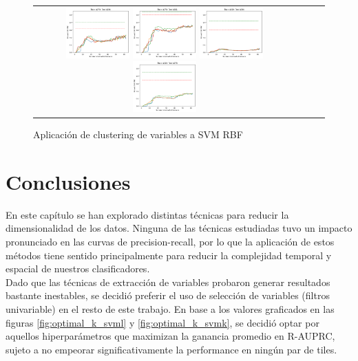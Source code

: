 \begin{figure}[h!]
\begin{tabular}{cccc}
\includegraphics[width=0.25\textwidth]{Kap5/rbf_ALL_LINKAGES_train=b278test=b234.png}  \includegraphics[width=0.25\textwidth]{Kap5/rbf_ALL_LINKAGES_train=b278test=b261.png} 
 \includegraphics[width=0.25\textwidth]{Kap5/rbf_ALL_LINKAGES_train=b360test=b234.png}  \includegraphics[width=0.25\textwidth]{Kap5/rbf_ALL_LINKAGES_train=b360test=b278.png} 
\end{tabular}
\caption{Aplicación de clustering de variables a SVM RBF}
\label{fig:agg_k}
\end{figure}

\section{Conclusiones}
\label{mejores_fs}
En este capítulo se han explorado distintas técnicas para reducir la dimensionalidad de los datos. Ninguna de las técnicas estudiadas tuvo un impacto pronunciado en las curvas de precision-recall, por lo que la aplicación de estos métodos tiene sentido principalmente para reducir la complejidad temporal y espacial de nuestros clasificadores. \\

Dado que las técnicas de extracción de variables probaron generar resultados bastante inestables, se decidió preferir el uso de selección de variables (filtros univariable) en el resto de este trabajo. En base a los valores graficados en las figuras \ref{fig:optimal_k_svml} y \ref{fig:optimal_k_svmk}, se decidió optar por aquellos hiperparámetros que maximizan la ganancia promedio en R-AUPRC, sujeto a no empeorar significativamente la performance en ningún par de tiles.

